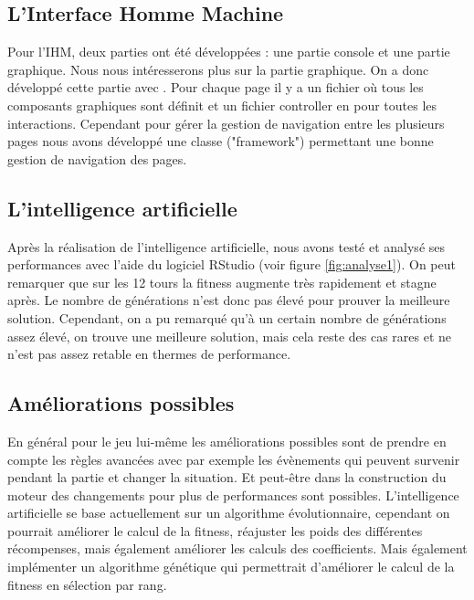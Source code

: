 \subsection{L'Interface Homme Machine}
Pour l'IHM, deux parties ont été développées : une partie console et une partie graphique.
Nous nous intéresserons plus sur la partie graphique. On a donc développé cette partie avec \fx. Pour chaque page il y a un fichier \fxml où tous les composants graphiques sont définit et un fichier controller en \java pour toutes les interactions. Cependant pour gérer la gestion de navigation entre les plusieurs pages nous avons développé une classe ("framework") permettant une bonne gestion de navigation des pages.
\subsection{L'intelligence artificielle }
Après la réalisation de l'intelligence artificielle, nous avons testé et analysé ses performances avec l'aide du logiciel RStudio (voir figure \ref{fig:analyse1}). On peut remarquer que sur les 12 tours la fitness augmente très rapidement et stagne après. Le nombre de générations n'est donc pas élevé pour prouver la meilleure solution. Cependant, on a pu remarqué qu'à un certain nombre de générations assez élevé, on trouve une meilleure solution, mais cela reste des cas rares et ne n'est pas assez retable en thermes de performance.

\subsection{Améliorations possibles}
En général pour le jeu lui-même les améliorations possibles sont de prendre en compte les règles avancées avec par exemple les évènements qui peuvent survenir pendant la partie et changer la situation. Et peut-être dans la construction du moteur des changements pour plus de performances sont possibles.
L'intelligence artificielle se base actuellement sur un algorithme évolutionnaire, cependant on pourrait améliorer le calcul de la fitness, réajuster les poids des différentes récompenses, mais également améliorer les calculs des coefficients. Mais également implémenter un algorithme génétique qui permettrait d'améliorer le calcul de la fitness en sélection par rang.